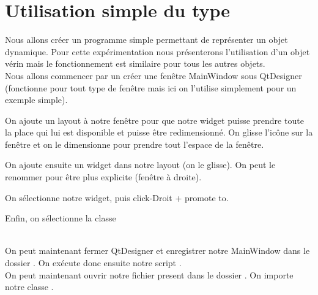  
 
 

 
\section{Utilisation simple du type}

Nous allons créer un programme simple permettant de représenter un objet dynamique. Pour cette expérimentation nous présenterons l'utilisation d'un objet vérin mais le fonctionnement est similaire pour tous les autres objets.\\

Nous allons commencer par un créer une fenêtre MainWindow sous QtDesigner (fonctionne pour tout type de fenêtre mais ici on l'utilise simplement pour un exemple simple).


On ajoute un layout à notre fenêtre pour que notre widget puisse prendre toute la place qui lui est disponible et puisse être redimensionné. On glisse l'icône sur la fenêtre et on le dimensionne pour prendre tout l'espace de la fenêtre.


On ajoute ensuite un widget dans notre layout (on le glisse). On peut le renommer pour être plus explicite (fenêtre à droite).


On sélectionne notre widget, puis click-Droit + promote to. 


Enfin, on sélectionne la classe 

\textcolor{red}{} \\

On peut maintenant fermer QtDesigner et enregistrer notre MainWindow dans le dossier . On exécute donc ensuite notre script .\\

On peut maintenant ouvrir notre  fichier  present dans le dossier . On importe notre classe .

